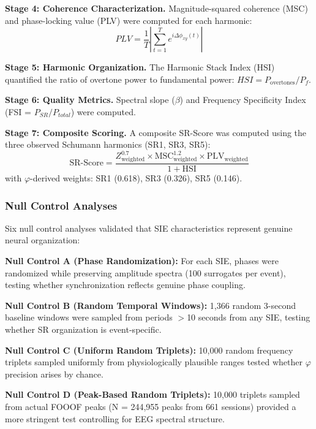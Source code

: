 \documentclass[11pt,a4paper]{article}
\newcommand{\phisym}{\varphi}
\begin{document}
\textbf{Stage 4: Coherence Characterization.}
Magnitude-squared coherence (MSC) and phase-locking value (PLV) \parencite{lachaux1999plv} were computed for each harmonic:
\begin{equation}
PLV = \frac{1}{T}\left|\sum_{t=1}^{T} e^{i\Delta\phi_{xy}(t)}\right|
\end{equation}

\textbf{Stage 5: Harmonic Organization.}
The Harmonic Stack Index (HSI) quantified the ratio of overtone power to fundamental power: $HSI = P_{\text{overtones}} / P_f$.

\textbf{Stage 6: Quality Metrics.}
Spectral slope ($\beta$) and Frequency Specificity Index (FSI = $P_{SR}/P_{total}$) were computed.

\textbf{Stage 7: Composite Scoring.}
A composite SR-Score was computed using the three observed Schumann harmonics (SR1, SR3, SR5):
\begin{equation}
\text{SR-Score} = \frac{Z_{\text{weighted}}^{0.7} \times \text{MSC}_{\text{weighted}}^{1.2} \times \text{PLV}_{\text{weighted}}}{1 + \text{HSI}}
\end{equation}
with $\phisym$-derived weights: SR1 (0.618), SR3 (0.326), SR5 (0.146).

\subsubsection{Null Control Analyses}

Six null control analyses validated that SIE characteristics represent genuine neural organization:

\textbf{Null Control A (Phase Randomization):} For each SIE, phases were randomized while preserving amplitude spectra (100 surrogates per event), testing whether synchronization reflects genuine phase coupling.

\textbf{Null Control B (Random Temporal Windows):} 1,366 random 3-second baseline windows were sampled from periods $>$10 seconds from any SIE, testing whether SR organization is event-specific.

\textbf{Null Control C (Uniform Random Triplets):} 10,000 random frequency triplets sampled uniformly from physiologically plausible ranges tested whether $\phisym$ precision arises by chance.

\textbf{Null Control D (Peak-Based Random Triplets):} 10,000 triplets sampled from actual FOOOF peaks (N = 244,955 peaks from 661 sessions) provided a more stringent test controlling for EEG spectral structure.
\end{document}
